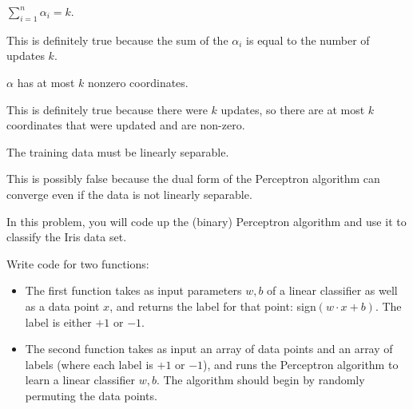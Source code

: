 \documentclass{article}
\begin{document}
\begin{probset}
\begin{prob}
\begin{subprobset}
    \begin{subprob}
        $\sum_{i=1}^n \alpha_i = k$.

        \begin{soln}
            This is definitely true because the sum of the $\alpha_i$ is equal to the number of updates $k$.
        \end{soln}
    \end{subprob}

    \begin{subprob}
        $\alpha$ has at most $k$ nonzero coordinates.

        \begin{soln}
            This is definitely true because there were $k$ updates, so there are at most $k$ coordinates that were updated and are non-zero.
        \end{soln}
    \end{subprob}

    \begin{subprob}
        The training data must be linearly separable.

        \begin{soln}
            This is possibly false because the dual form of the Perceptron algorithm can converge even if the data is not linearly separable.
        \end{soln}
    \end{subprob}
    \end{subprobset}
\end{prob}

\newpage

\begin{progprob}
    In this problem, you will code up the (binary) Perceptron algorithm and use it to classify the Iris data set.

    \begin{subprobset}
    \begin{subprob}
        Write code for two functions:

        \begin{itemize}
            \item The first function takes as input parameters $w, b$ of a linear classifier as well as a data point $x$, and returns the label for that point: sign$(w \cdot x + b)$. The label is either $+1$ or $-1$.
            \item The second function takes as input an array of data points and an array of labels (where each label is $+1$ or $-1$), and runs the Perceptron algorithm to learn a linear classifier $w, b$. The algorithm should begin by randomly permuting the data points.
        \end{itemize}


\end{subprob}
\end{subprobset}
\end{progprob}
\end{probset}
\end{document}

